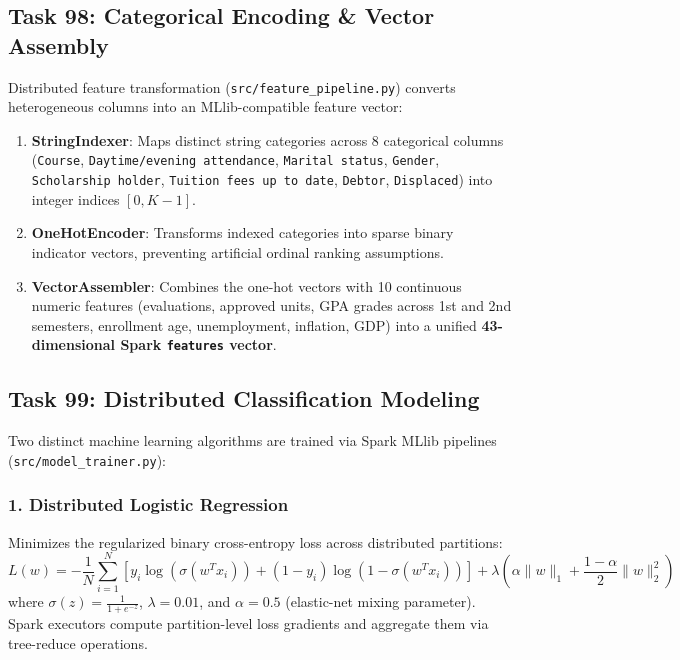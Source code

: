 \documentclass[11pt,a4paper]{article}
\begin{document}
\subsection{Task 98: Categorical Encoding \& Vector Assembly}
Distributed feature transformation (\texttt{src/feature\_pipeline.py}) converts heterogeneous columns into an MLlib-compatible feature vector:
\begin{enumerate}
    \item \textbf{StringIndexer}: Maps distinct string categories across 8 categorical columns (\texttt{Course}, \texttt{Daytime/evening attendance}, \texttt{Marital status}, \texttt{Gender}, \texttt{Scholarship holder}, \texttt{Tuition fees up to date}, \texttt{Debtor}, \texttt{Displaced}) into integer indices $[0, K-1]$.
    \item \textbf{OneHotEncoder}: Transforms indexed categories into sparse binary indicator vectors, preventing artificial ordinal ranking assumptions.
    \item \textbf{VectorAssembler}: Combines the one-hot vectors with 10 continuous numeric features (evaluations, approved units, GPA grades across 1st and 2nd semesters, enrollment age, unemployment, inflation, GDP) into a unified \textbf{43-dimensional Spark \texttt{features} vector}.
\end{enumerate}

\subsection{Task 99: Distributed Classification Modeling}
Two distinct machine learning algorithms are trained via Spark MLlib pipelines (\texttt{src/model\_trainer.py}):

\subsubsection{1. Distributed Logistic Regression}
Minimizes the regularized binary cross-entropy loss across distributed partitions:
\begin{equation}
    L(w) = -\frac{1}{N} \sum_{i=1}^N \left[ y_i \log(\sigma(w^T x_i)) + (1 - y_i) \log(1 - \sigma(w^T x_i)) \right] + \lambda \left( \alpha \|w\|_1 + \frac{1-\alpha}{2} \|w\|_2^2 \right)
\end{equation}
where $\sigma(z) = \frac{1}{1 + e^{-z}}$, $\lambda = 0.01$, and $\alpha = 0.5$ (elastic-net mixing parameter). Spark executors compute partition-level loss gradients and aggregate them via tree-reduce operations.
\end{document}
